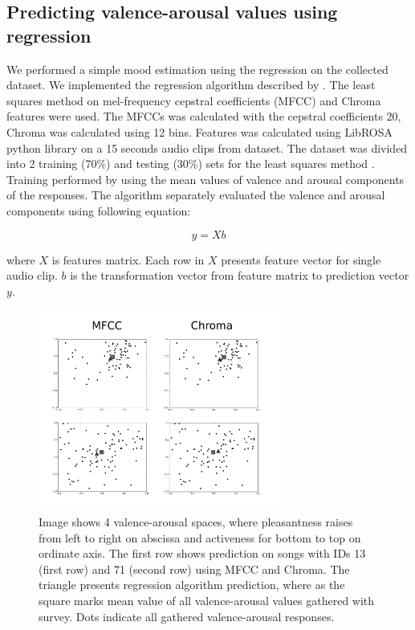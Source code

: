 \documentclass[a4paper]{article}
\begin{document}
\subsection{Predicting valence-arousal values using regression}

We performed a simple mood estimation using the regression on the collected dataset. We implemented the regression algorithm described by \cite{schmidt2009projection}. The least squares method on mel-frequency cepstral coefficients (MFCC) \cite{logan2000mel} and Chroma \cite{bello2005robust} features were used. The MFCCs was calculated with the cepstral coefficients 20, Chroma was calculated using 12 bins. Features was calculated using LibROSA python library on a 15 seconds audio clips from dataset. The dataset was divided into 2 training (70\%) and  testing (30\%) sets for the least squares method \cite{abdi2007method}. Training performed by using the mean values of valence and arousal components of the responses. The algorithm separately evaluated the valence and arousal components using following equation:

\begin{equation} 
y = X b
\end{equation} 

where $X$ is features matrix. Each row in $X$ presents feature vector for single audio clip. $b$  is the transformation vector from feature matrix to prediction vector $y$.

\begin{figure}[ht]
\centering
\includegraphics[width=80mm]{graphs1.png}
\caption{Image shows 4 valence-arousal spaces, where pleasantness raises from left to right on abscissa and activeness for bottom to top on ordinate axis. The first row shows prediction on songs with IDs 13 (first row) and 71 (second row) using MFCC and Chroma. The triangle presents regression algorithm prediction, where as the square marks mean value of all valence-arousal values gathered with survey. Dots indicate all gathered valence-arousal responses.}
\label{graphs}
\end{figure}
\end{document}
